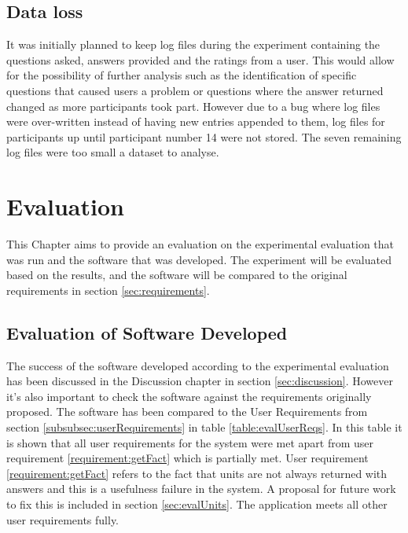 \documentclass[authoryearcitations]{UoYCSproject}
\begin{document}
\section{Data loss}
\label{sec:dataLoss}

It was initially planned to keep log files during the experiment containing the questions asked, answers provided and the ratings from a user. This would allow for the possibility of further analysis such as the identification of specific questions that caused users a problem or questions where the answer returned changed as more participants took part. However due to a bug where log files were over-written instead of having new entries appended to them, log files for participants up until participant number 14 were not stored. The seven remaining log files were too small a dataset to analyse.

\newpage

\newpage
\chapter{Evaluation}
\label{sec:evaluation}

This Chapter aims to provide an evaluation on the experimental evaluation that was run and the software that was developed. The experiment will be evaluated based on the results, and the software will be compared to the original requirements in section \ref{sec:requirements}.

\section{Evaluation of Software Developed}
\label{sec:evalSoftwareDeveloped}


The success of the software developed according to the experimental evaluation has been discussed in the Discussion chapter in section \ref{sec:discussion}. However it's also important to check the software against the requirements originally proposed. The software has been compared to the User Requirements from section \ref{subsubsec:userRequirements} in table \ref{table:evalUserReqs}. In this table it is shown that all user requirements for the system were met apart from user requirement \ref{requirement:getFact} which is partially met. User requirement \ref{requirement:getFact} refers to the fact that units are not always returned with answers and this is a usefulness failure in the system. A proposal for future work to fix this is included in section \ref{sec:evalUnits}. The application meets all other user requirements fully.
\end{document}
